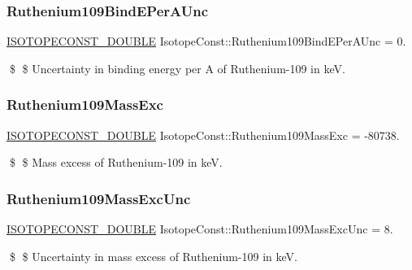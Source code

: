 \subsubsection{\texorpdfstring{Ruthenium109\+Bind\+E\+Per\+A\+Unc}{Ruthenium109BindEPerAUnc}}
{\footnotesize\ttfamily \mbox{\hyperlink{group___isotope_const-_macros_ga8f45a7272ce02c0b4c65c44636ed719a}{I\+S\+O\+T\+O\+P\+E\+C\+O\+N\+S\+T\+\_\+\+D\+O\+U\+B\+LE}} Isotope\+Const\+::\+Ruthenium109\+Bind\+E\+Per\+A\+Unc = 0.}

\$ \$ Uncertainty in binding energy per A of Ruthenium-\/109 in keV. \mbox{\label{group___isotope_const-_ruthenium-_ru109_ga37a48e0419c91e9253e1e11feb1bd5c0}} 
\subsubsection{\texorpdfstring{Ruthenium109\+Mass\+Exc}{Ruthenium109MassExc}}
{\footnotesize\ttfamily \mbox{\hyperlink{group___isotope_const-_macros_ga8f45a7272ce02c0b4c65c44636ed719a}{I\+S\+O\+T\+O\+P\+E\+C\+O\+N\+S\+T\+\_\+\+D\+O\+U\+B\+LE}} Isotope\+Const\+::\+Ruthenium109\+Mass\+Exc = -\/80738.}

\$ \$ Mass excess of Ruthenium-\/109 in keV. \mbox{\label{group___isotope_const-_ruthenium-_ru109_gab243a2a0f144a6480bc719a3a879042d}} 
\subsubsection{\texorpdfstring{Ruthenium109\+Mass\+Exc\+Unc}{Ruthenium109MassExcUnc}}
{\footnotesize\ttfamily \mbox{\hyperlink{group___isotope_const-_macros_ga8f45a7272ce02c0b4c65c44636ed719a}{I\+S\+O\+T\+O\+P\+E\+C\+O\+N\+S\+T\+\_\+\+D\+O\+U\+B\+LE}} Isotope\+Const\+::\+Ruthenium109\+Mass\+Exc\+Unc = 8.}

\$ \$ Uncertainty in mass excess of Ruthenium-\/109 in keV. \mbox{\label{group___isotope_const-_ruthenium-_ru109_gae4032028816fb4759f81747c00209ea5}} 
